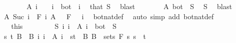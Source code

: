 \begin{isabellebody}
\ \ \ \ \isamarkupfalse%
\ \isamarkupfalse%
\ {\isachardoublequoteopen}A\ i\ {\isacharequal}{\kern0pt}\ {\isacharbraceleft}{\kern0pt}{\isacharbraceright}{\kern0pt}{\isachardoublequoteclose}\ \ {\isachardoublequoteopen}i\ {\isasymnoteq}\ bot{\isachardoublequoteclose}\ \ i\ \isamarkupfalse%
\ that\ S\ \isamarkupfalse%
\ blast\isanewline
\ \ \ \ \isamarkupfalse%
\ \isamarkupfalse%
\ {\isachardoublequoteopen}A\ bot\ {\isacharequal}{\kern0pt}\ S{\isachardoublequoteclose}\ \isamarkupfalse%
\ S\ \isamarkupfalse%
\ blast\isanewline
\ \ \ \ \isamarkupfalse%
\ \isamarkupfalse%
\ {\isachardoublequoteopen}A\ {\isacharparenleft}{\kern0pt}Suc\ i{\isacharparenright}{\kern0pt}\ {\isasymin}\ F\ i{\isachardoublequoteclose}\ {\isachardoublequoteopen}A\ {}\ {\isasymin}\ F\ {}{\isachardoublequoteclose}\ \ i\ \isamarkupfalse%
\ bot{\isacharunderscore}{\kern0pt}nat{\isacharunderscore}{\kern0pt}def\ \isamarkupfalse%
\ {\isacharparenleft}{\kern0pt}auto\ simp\ add{\isacharcolon}{\kern0pt}\ bot{\isacharunderscore}{\kern0pt}nat{\isacharunderscore}{\kern0pt}def{\isacharparenright}{\kern0pt}\isanewline
\ \ \isacommand{{\isacharbraceright}{\kern0pt}}\isamarkupfalse%
\isanewline
\ \ \isamarkupfalse%
\ {\isacharasterisk}{\kern0pt}\ {\isacharequal}{\kern0pt}\ this\isanewline
\ \ \isacommand{{\isacharbraceleft}{\kern0pt}}\isamarkupfalse%
\isanewline
\ \ \ \ \isamarkupfalse%
\ {\isachardoublequoteopen}{\isasymnexists}S{\isachardot}{\kern0pt}\ {\isacharparenleft}{\kern0pt}{\isasymUnion}i{\isachardot}{\kern0pt}\ {\isacharbraceleft}{\kern0pt}i{\isacharbraceright}{\kern0pt}\ {\isasymtimes}\ A\ i{\isacharparenright}{\kern0pt}\ {\isacharequal}{\kern0pt}\ {\isacharbraceleft}{\kern0pt}bot{\isacharbraceright}{\kern0pt}\ {\isasymtimes}\ S{\isachardoublequoteclose}\isanewline
\ \ \ \ \isamarkupfalse%
\ \isamarkupfalse%
\ s\ t\ B\ \ B{\isacharcolon}{\kern0pt}\ {\isachardoublequoteopen}{\isacharparenleft}{\kern0pt}{\isasymUnion}i{\isachardot}{\kern0pt}\ {\isacharbraceleft}{\kern0pt}i{\isacharbraceright}{\kern0pt}\ {\isasymtimes}\ A\ i{\isacharparenright}{\kern0pt}\ {\isacharequal}{\kern0pt}\ {\isacharbraceleft}{\kern0pt}s{\isacharless}{\kern0pt}{\isachardot}{\kern0pt}{\isachardot}{\kern0pt}t{\isacharbraceright}{\kern0pt}\ {\isasymtimes}\ B{\isachardoublequoteclose}\ {\isachardoublequoteopen}B\ {\isasymin}\ sets\ {\isacharparenleft}{\kern0pt}F\ s{\isacharparenright}{\kern0pt}{\isachardoublequoteclose}\ {\isachardoublequoteopen}s\ {\isacharless}{\kern0pt}\ t{\isachardoublequoteclose}\ \isamarkupfalse%

\end{isabellebody}
